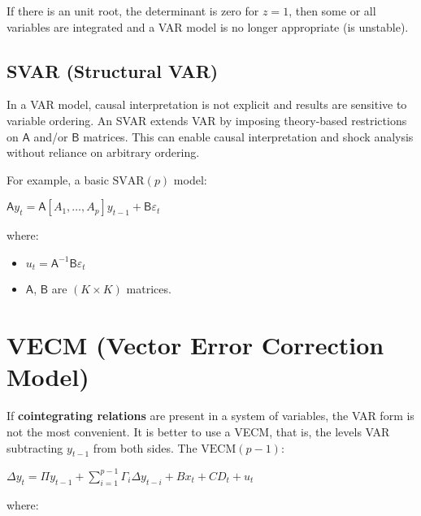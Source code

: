 \documentclass[10pt, a4paper, landscape]{article}
\begin{document}
\begin{multicols}{2}
If there is an unit root, the determinant is zero for \( z = 1 \), then some or all variables are integrated and a VAR model is no longer appropriate (is unstable).

\subsection*{SVAR (Structural VAR)}

In a VAR model, causal interpretation is not explicit and results are sensitive to variable ordering. An SVAR extends VAR by imposing theory-based restrictions on \( \mathsf{A} \) and/or \( \mathsf{B} \) matrices. This can enable causal interpretation and shock analysis without reliance on arbitrary ordering.

For example, a basic \( \text{SVAR}(p) \) model:

\begin{center}
	\( \mathsf{A} y_t = \mathsf{A} [A_1, \ldots, A_p] y_{t - 1} + \mathsf{B} \varepsilon_t \)
\end{center}

where:

\begin{itemize}[leftmargin=*]
	\item \( u_t = \mathsf{A}^{-1} \mathsf{B} \varepsilon_t \)
	\item \( \mathsf{A} \), \( \mathsf{B} \) are \( (K \times K) \) matrices.
\end{itemize}

\columnbreak

\section*{VECM (Vector Error Correction Model)}

If \textbf{cointegrating relations} are present in a system of variables, the VAR form is not the most convenient. It is better to use a VECM, that is, the levels VAR subtracting \( y_{t - 1} \) from both sides. The \( \text{VECM}(p - 1) \):

\begin{center}
	\( \Delta y_{t} = \Pi y_{t - 1} + \sum_{i = 1}^{p - 1} \Gamma_{i} \Delta y_{t - i} + B x_{t} + CD_{t} + u_{t} \)
\end{center}

where:


\end{multicols}
\end{document}
